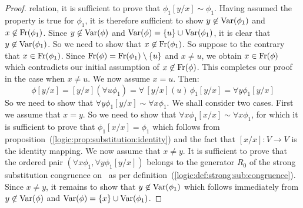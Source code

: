 \begin{proof}
relation, it is sufficient to prove that
$\phi_{1}[y/x]\sim\phi_{1}$. Having assumed the property is true for
$\phi_{1}$, it is therefore sufficient to show
$y\not\in\mbox{\rm Var}(\phi_{1})$ and $x\not\in\mbox{\rm Fr}(\phi_{1})$. Since
$y\not\in\mbox{\rm Var}(\phi)$ and $\mbox{\rm Var}(\phi)=\{u\}\cup\mbox{\rm Var}(\phi_{1})$, it is
clear that $y\not\in\mbox{\rm Var}(\phi_{1})$. So we need to show that
$x\not\in\mbox{\rm Fr}(\phi_{1})$. So suppose to the contrary that
$x\in\mbox{\rm Fr}(\phi_{1})$. Since
$\mbox{\rm Fr}(\phi)=\mbox{\rm Fr}(\phi_{1})\setminus\{u\}$ and $x\neq u$, we obtain
$x\in\mbox{\rm Fr}(\phi)$ which contradicts our initial assumption of
$x\not\in\mbox{\rm Fr}(\phi)$. This completes our proof in the case when
$x\neq u$. We now assume $x=u$. Then:
    \[
    \phi[y/x]=[y/x](\forall u\phi_{1})=\forall\,[y/x](u)\,\phi_{1}[y/x]=\forall y\phi_{1}[y/x]
    \]
So we need to show that $\forall y\phi_{1}[y/x]\sim\forall
x\phi_{1}$. We shall consider two cases. First we assume that $x=y$.
So we need to show that $\forall x\phi_{1}[x/x]\sim\forall
x\phi_{1}$, for which it is sufficient to prove that
$\phi_{1}[x/x]=\phi_{1}$ which follows from
proposition~(\ref{logic:prop:substitution:identity}) and the fact
that $[x/x]:V\to V$ is the identity mapping. We now assume that
$x\neq y$. It is sufficient to prove that the ordered pair $(\forall
x\phi_{1},\forall y\phi_{1}[y/x])$ belongs to the generator $R_{0}$
of the strong substitution congruence on \pv\ as per
definition~(\ref{logic:def:strong:sub:congruence}). Since $x\neq y$,
it remains to show that $y\not\in\mbox{\rm Var}(\phi_{1})$ which follows
immediately from $y\not\in\mbox{\rm Var}(\phi)$ and
$\mbox{\rm Var}(\phi)=\{x\}\cup\mbox{\rm Var}(\phi_{1})$.
\end{proof}

